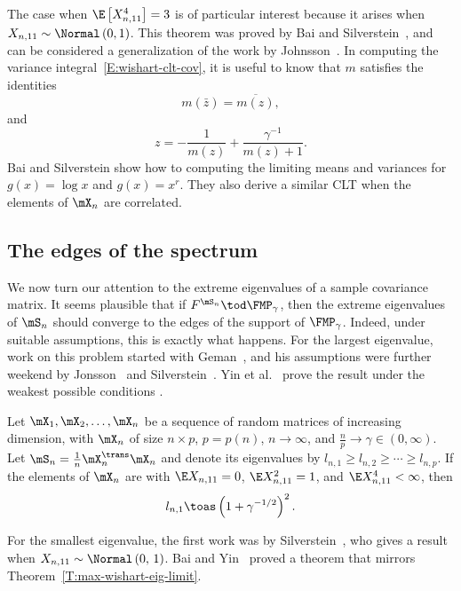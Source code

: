 \noindent
The case when $\E\left[ X_{n,11}^4 \right] = 3$ is of particular interest
because it arises when $X_{n,11} \sim \Normal\left( 0, 1 \right)$.
This theorem was proved by Bai and Silverstein~\cite{bai2004clt}, and can
be considered a generalization of the work by Johnsson~\cite{jonsson1982slt}.
In computing the variance integral~\eqref{E:wishart-clt-cov}, it is useful to know that $m$ satisfies
the identities 
\[
    m(\bar z) = \overline{m (z) },
\]
and
\[
    z = - \frac{1}{m(z)} + \frac{\gamma^{-1}}{m(z) + 1}.
\]
Bai and Silverstein show how to computing the limiting means and variances
for $g(x) = \log x$ and $g(x) = x^r$.  They also derive a similar CLT when
the elements of $\mX_n$ are correlated.


\subsection{The edges of the spectrum}

We now turn our attention to the extreme eigenvalues of a sample covariance
matrix.  It seems plausible that if $F^{\mS_n} \tod \FMP_\gamma$, then the
extreme eigenvalues of $\mS_n$ should converge to the edges of the support
of $\FMP_\gamma$.  Indeed, under suitable assumptions, this is exactly what
happens.  For the largest eigenvalue, work on this problem started with Geman~\cite{geman1980ltn}, and his assumptions were further weekend by Jonsson~\cite{jonsson1983ole} and Silverstein~\cite{silverstein1984ole}.
Yin et al.~\cite{yin1988lle} prove the result under the weakest possible
conditions \cite{bai1988nle}.

\begin{theorem}\label{T:max-wishart-eig-limit}
    Let $\mX_1, \mX_2, \ldots, \mX_n$ be a sequence of random matrices of
    increasing dimension, with $\mX_n$ of size $n \times p$, $p = p(n)$, 
    $n \to \infty$, and
    $\frac{n}{p} \to \gamma \in (0,\infty)$.  Let $\mS_n = \frac{1}{n} \mX_n^\trans \mX_n$ and 
    denote its eigenvalues by 
    $l_{n,1} \geq l_{n,2} \geq \cdots \geq l_{n,p}$.  If the 
    elements of $\mX_n$ are 
    \iid with $\E X_{n,11} = 0$, $\E X_{n,11}^2 = 1$, and
    $\E X_{n,11}^4 < \infty$, then
    \[
        l_{n,1} \toas \left( 1 + \gamma^{-1/2} \right)^2.
    \]
\end{theorem}

For the smallest eigenvalue, the first work was by Silverstein~\cite{silverstein1985sel}, who gives a result when 
$X_{n,11} \sim \Normal\left( 0,\, 1 \right)$.  Bai and Yin~\cite{bai1993lse} proved a theorem that mirrors Theorem~\ref{T:max-wishart-eig-limit}.

